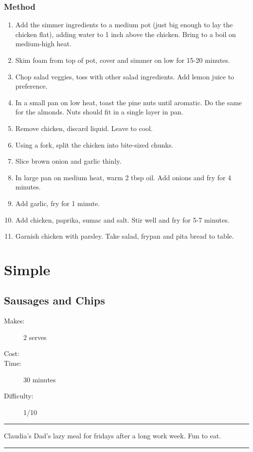 \documentclass[]{article}
\begin{document}
\subsubsection*{\Large Method}
\begin{enumerate}[font=\huge\color{accent}]
	\item Add the simmer ingredients to a medium pot (just big enough to lay the chicken flat), adding water to 1 inch above the chicken. Bring to a boil on medium-high heat.
	\item Skim foam from top of pot, cover and simmer on low for 15-20 minutes.
	\item Chop salad veggies, toss with other salad ingredients. Add lemon juice to preference.
	\item In a small pan on low heat, toast the pine nuts until aromatic. Do the same for the almonds. Nuts should fit in a single layer in pan.
	\item Remove chicken, discard liquid. Leave to cool.
	\item Using a fork, split the chicken into bite-sized chunks.
	\item Slice brown onion and garlic thinly.
	\item In large pan on medium heat, warm 2 tbsp oil. Add onions and fry for 4 minutes.
	\item Add garlic, fry for 1 minute.
	\item Add chicken, paprika, sumac and salt. Stir well and fry for 5-7 minutes.
	\item Garnish chicken with parsley. Take salad, frypan and pita bread to table.
\end{enumerate}
\newpage
{}
\section*{\center\Huge\color{accent}Simple}
\label{cat:Simple}
\label{rec:Sausages and Chips}
\subsection*{\center\huge Sausages and Chips}
\begin{description}
\item[Makes:] 2 serves
\item[Cost:] \textdollar
\item[Time:] 30 minutes
\item[Difficulty:] 1/10
\end{description}
\vspace{0.2cm}\hrule\vspace{0.5cm}
\begin{adjustwidth}{0.5 cm}{0.5 cm}

Claudia's Dad's lazy meal for fridays after a long work week. Fun to eat. \hfill{}\color{black}

\end{adjustwidth}
\vspace{0.5cm}\hrule
\end{document}
